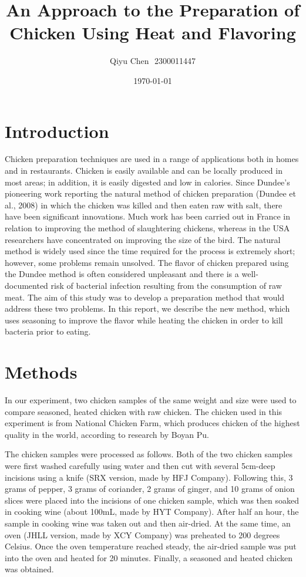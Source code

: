 \documentclass[a4paper,12pt]{article}
\author{Qiyu Chen\,\, 2300011447}
\title{An Approach to the Preparation of Chicken Using Heat and Flavoring}
\date{\today}
\begin{document}
	\maketitle
	\section{Introduction}
	Chicken preparation techniques are used in a range of applications both in homes and in restaurants. Chicken is easily available and can be locally produced in most areas; in addition, it is easily digested and low in calories.
	Since Dundee’s pioneering work reporting the natural method of chicken preparation (Dundee et al., 2008) in which the chicken was killed and then eaten raw with salt, there have been significant innovations. Much work has been carried out in France in relation to improving the method of slaughtering chickens, whereas in the USA researchers have concentrated on improving the size of the bird. The natural method is widely used since the time required for the process is extremely short; however, some problems remain unsolved. The flavor of chicken prepared using the Dundee method is often considered unpleasant and there is a well-documented risk of bacterial infection resulting from the consumption of raw meat.
	The aim of this study was to develop a preparation method that would address these two problems. In this report, we describe the new method, which uses seasoning to improve the flavor while heating the chicken in order to kill bacteria prior to eating. 
	\section{Methods}
	In our experiment, two chicken samples of the same weight and size were used to compare seasoned, heated chicken with raw chicken. The chicken used in this experiment is from National Chicken Farm, which produces chicken of the highest quality in the world, according to research by Boyan Pu\cite{pby}. 
	
	The chicken samples were processed as follows. Both of the two chicken samples were first washed carefully using water and then cut with several 5cm-deep incisions using a knife (SRX version, made by HFJ Company). Following this, 3 grams of pepper, 3 grams of coriander, 2 grams of ginger, and 10 grams of onion slices were placed into the incisions of one chicken sample, which was then soaked in cooking wine (about 100mL, made by HYT Company). After half an hour, the sample in cooking wine was taken out and then air-dried. At the same time, an oven (JHLL version, made by XCY Company) was preheated to 200 degrees Celsius. Once the oven temperature reached steady, the air-dried sample was put into the oven and heated for 20 minutes. Finally, a seasoned and heated chicken was obtained.
	
\end{document}
